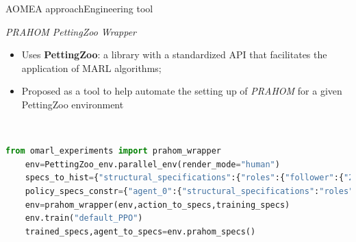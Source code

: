\begin{frame}[fragile]{AOMEA approach}{Engineering tool}

    \begin{block}{\emph{PRAHOM PettingZoo Wrapper}\label{PettingZoo-wrapper}}
        \begin{itemize}
            \item Uses \textbf{PettingZoo}: a library with a standardized API that facilitates the application of MARL algorithms;
            \item Proposed as a tool to help automate the setting up of \emph{PRAHOM} for a given PettingZoo environment
        \end{itemize}
    \end{block}

    \

    \begin{lstlisting}[language=Python, caption=PRAHOM PettingZoo Wrapper basic use, label={lst:wrapper_basic_use}]
    from omarl_experiments import prahom_wrapper
    env=PettingZoo_env.parallel_env(render_mode="human")
    specs_to_hist={"structural_specifications":{"roles":{"follower":{"23":41,"14":[74,0]}}...},"functional_specifications":{"links":{"(leader,follower,aut)":".*14.*?89"}...}...}
    policy_specs_constr={"agent_0":{"structural_specifications":"roles":["follower"]}}
    env=prahom_wrapper(env,action_to_specs,training_specs)
    env.train("default_PPO")
    trained_specs,agent_to_specs=env.prahom_specs()
    \end{lstlisting}

\end{frame}
